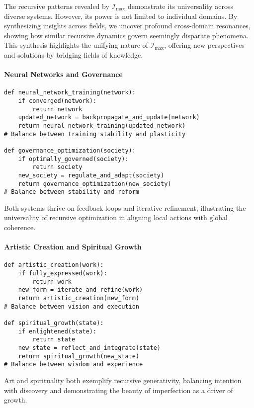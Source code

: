 \documentclass[12pt]{article}
\begin{document}
The recursive patterns revealed by \(\mathcal{I}_{\text{max}}\) demonstrate its universality across diverse systems. However, its power is not limited to individual domains. By synthesizing insights across fields, we uncover profound cross-domain resonances, showing how similar recursive dynamics govern seemingly disparate phenomena. This synthesis highlights the unifying nature of \(\mathcal{I}_{\text{max}}\), offering new perspectives and solutions by bridging fields of knowledge.

\paragraph{Neural Networks and Governance}
\begin{verbatim}
def neural_network_training(network):
    if converged(network):
        return network
    updated_network = backpropagate_and_update(network)
    return neural_network_training(updated_network)
# Balance between training stability and plasticity

def governance_optimization(society):
    if optimally_governed(society):
        return society
    new_society = regulate_and_adapt(society)
    return governance_optimization(new_society)
# Balance between stability and reform
\end{verbatim}

Both systems thrive on feedback loops and iterative refinement, illustrating the universality of recursive optimization in aligning local actions with global coherence.

\paragraph{Artistic Creation and Spiritual Growth}
\begin{verbatim}
def artistic_creation(work):
    if fully_expressed(work):
        return work
    new_form = iterate_and_refine(work)
    return artistic_creation(new_form)
# Balance between vision and execution

def spiritual_growth(state):
    if enlightened(state):
        return state
    new_state = reflect_and_integrate(state)
    return spiritual_growth(new_state)
# Balance between wisdom and experience
\end{verbatim}

Art and spirituality both exemplify recursive generativity, balancing intention with discovery and demonstrating the beauty of imperfection as a driver of growth.
\end{document}
